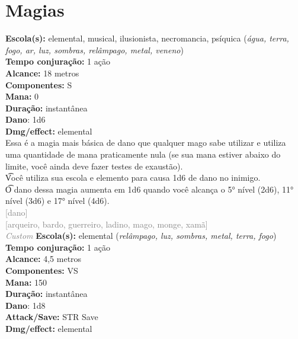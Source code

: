 \documentclass{RPG_Adventure}[2021/10/20]
\begin{document}
\jump\chapter{Magias}\n\n{}
{\small \t \textbf{Escola(s):} elemental, musical, ilusionista, necromancia, psíquica (\textit{água, terra, fogo, ar, luz, sombras, relâmpago, metal, veneno})\\\t \textbf{Tempo conjuração:} 1 ação\\\t \textbf{Alcance:} 18 metros\\\t \textbf{Componentes:} S\\\t \textbf{Mana:} 0\\\t \textbf{Duração:} instantânea\\\t \textbf{Dano}: 1d6\\\t \textbf{Dmg/effect:} elemental\\}
{\normalsize Essa é a magia mais básica de dano que qualquer mago sabe utilizar e utiliza uma quantidade de mana praticamente nula (se sua mana estiver abaixo do limite, você ainda deve fazer testes de exaustão).\\\t Você utiliza sua escola e elemento para causa 1d6 de dano no inimigo.\\\t O dano dessa magia aumenta em 1d6 quando você alcança o 5° nível (2d6), 11° nível (3d6) e 17° nível (4d6).\\}
{\scriptsize \textcolor{gray}{[dano]\\}}
{\scriptsize \textcolor{gray}{[arqueiro, bardo, guerreiro, ladino, mago, monge, xamã]\\}}
{\tiny \textcolor{gray}{\textit{Custom}}}\jump{}
{\small \t \textbf{Escola(s):} elemental (\textit{relâmpago, luz, sombras, metal, terra, fogo})\\\t \textbf{Tempo conjuração:} 1 ação\\\t \textbf{Alcance:} 4,5 metros\\\t \textbf{Componentes:} VS\\\t \textbf{Mana:} 150\\\t \textbf{Duração:} instantânea\\\t \textbf{Dano}: 1d8\\\t \textbf{Attack/Save:} STR Save\\\t \textbf{Dmg/effect:} elemental\\}
\end{document}
